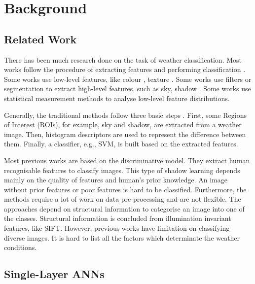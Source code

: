 
\chapter{Background} %
\label{Chapter2}

\section{Related Work}

There has been much research done on the task of weather classification. Most works follow the procedure of extracting features and performing classification \citep{bishop1995neural,roser2008classification,serrano2002computationally,gokalp2007scene}.
Some works use low-level features, like colour \citep{szummer1998indoor}, texture \citep{shotton2009textonboost,vailaya2002automatic}. Some works use filters or segmentation \citep{boutell2004learning,shotton2009textonboost} to extract high-level features, such as sky, shadow \citep{lutwo}. Some works use statistical measurement methods \citep{he2014spatial,roser2008classification} to analyse low-level feature distributions.

Generally, the traditional methods follow three basic steps \citep{roser2008classification,yan2009weather}. First, some Regions of Interest (ROIs), for example, sky and shadow,  are extracted from a weather image. Then, histogram descriptors are used to represent the difference between them. Finally, a classifier, e.g., SVM, is built based on the extracted features. 

Most previous works are based on the discriminative model. They extract human recognisable features to classify images. This type of shadow learning depends mainly on the quality of features and human's prior knowledge. An image without prior features or poor features is hard to be classified. Furthermore, the methods require a lot of work on data pre-processing and are not flexible. The approaches depend on structural information to categorise an image into one of the classes. Structural information is concluded from illumination invariant features, like SIFT. However, previous works have limitation on classifying diverse images. It is hard to list all the factors which determinate the weather conditions.

\section{Single-Layer ANNs}

